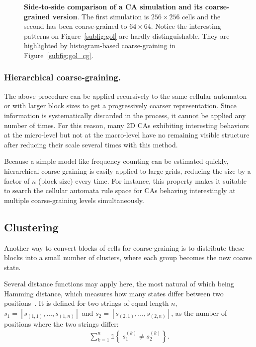 \begin{figure}[th]
  \caption{\label{fig:gol_comparison}\textbf{Side-to-side comparison of a CA
      simulation and its coarse-grained version}. The first simulation is $256
    \times 256$ cells and the second has been coarse-grained to $64\times 64$.
    Notice the interesting patterns on Figure~\ref{subfig:gol} are hardly
    distinguishable. They are highlighted by histogram-based coarse-graining in
    Figure~\ref{subfig:gol_cg}.}
\end{figure}


\subsubsection{Hierarchical coarse-graining.}
The above procedure can be applied recursively to the same cellular automaton or
with larger block sizes to get a progressively coarser representation. Since
information is systematically discarded in the process, it cannot be applied any
number of times. For this reason, many 2D CAs exhibiting interesting behaviors at
the micro-level but not at the macro-level have no remaining visible structure
after reducing their scale several times with this method.

Because a simple model like frequency counting can be estimated quickly,
hierarchical coarse-graining is easily applied to large grids, reducing the size
by a factor of $n$ (block size) every time. For instance, this property makes it
suitable to search the cellular automata rule space for CAs behaving
interestingly at multiple coarse-graining levels simultaneously.

\subsection{Clustering}

Another way to convert blocks of cells for coarse-graining is to distribute
these blocks into a small number of clusters, where each group becomes the new
coarse state.

Several distance functions may apply here, the most natural of which being
Hamming distance, which measures how many states differ between two
positions~\cite{hammingErrorDetectingError1950}. It is defined for two strings
of equal length $n$, $s_1 = [s_{(1, 1)}, \ldots, s_{(1,n)}]$ and $s_2 =
[s_{(2,1)}, \ldots, s_{(2,n)}]$, as the number of positions where the two
strings differ:
\begin{align}
  \sum_{k = 1}^n \mathds{1}\left\{\ s_1^{(k)}  \neq s_2^{(k)}\right\}.
\end{align}

